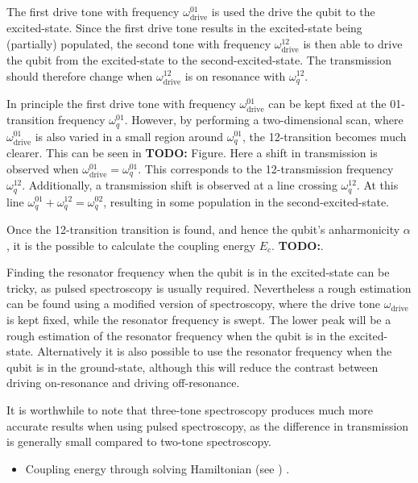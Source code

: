         The first drive tone with frequency $\omega_\text{drive}^{01}$ is used the drive the qubit to the excited-state. Since the first drive tone results in the excited-state being (partially) populated, the second tone with frequency $\omega_\text{drive}^{12}$ is then able to drive the qubit from the excited-state to the second-excited-state. The transmission should therefore change when $\omega_\text{drive}^{12}$ is on resonance with $\omega_q^{12}$.

        In principle the first drive tone with frequency $\omega_\text{drive}^{01}$ can be kept fixed at the 01-transition frequency $\omega_q^{01}$. However, by performing a two-dimensional scan, where $\omega_\text{drive}^{01}$ is also varied in a small region around $\omega_q^{01}$, the 12-transition becomes much clearer. This can be seen in \textbf{TODO:} Figure. Here a shift in transmission is observed when $\omega_\text{drive}^{01} = \omega_q^{01}$. This corresponds to the 12-transmission frequency $\omega_q^{12}$. Additionally, a transmission shift is observed at a line crossing $\omega_q^{12}$. At this line $\omega_q^{01} + \omega_q^{12} = \omega_q^{02}$, resulting in some population in the second-excited-state.

        Once the 12-transition transition is found, and hence the qubit's anharmonicity $\alpha$, it is the possible to calculate the coupling energy $E_c$. \textbf{TODO:}.

        Finding the resonator frequency when the qubit is in the excited-state can be tricky, as pulsed spectroscopy is usually required. Nevertheless a rough estimation can be found using a modified version of spectroscopy, where the drive tone $\omega_\text{drive}$ is kept fixed, while the resonator frequency is swept. The lower peak will be a rough estimation of the resonator frequency when the qubit is in the excited-state. Alternatively it is also possible to use the resonator frequency when the qubit is in the ground-state, although this will reduce the contrast between driving on-resonance and driving off-resonance.

        It is worthwhile to note that three-tone spectroscopy produces much more accurate results when using pulsed spectroscopy, as the difference in transmission is generally small compared to two-tone spectroscopy.


        \begin{itemize}
           \item Coupling energy through solving Hamiltonian (see \cite{Reed}) .
        \end{itemize}

